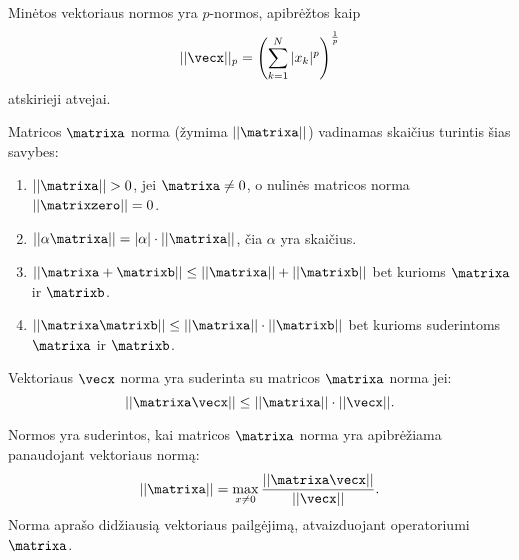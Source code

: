 

Minėtos vektoriaus normos yra $p$-normos, apibrėžtos kaip
\begin{equation*}
  ||\vecx||_{p} = \left( \sum_{k=1}^{N}|x_{k}|^{p} \right)^{\frac{1}{p}}
\end{equation*}
atskirieji atvejai.


\begin{defn}
  Matricos $\matrixa$ norma (žymima $||\matrixa||$) vadinamas skaičius
  turintis šias savybes:
  \begin{enumerate}
    \item $||\matrixa|| > 0$, jei $\matrixa \neq 0$, o nulinės matricos
      norma $||\matrixzero|| = 0$.
    \item $||\alpha\matrixa|| = |\alpha|\cdot||\matrixa||$, čia $\alpha$
      yra skaičius.
    \item $||\matrixa + \matrixb|| \leq ||\matrixa|| + ||\matrixb||$
      bet kurioms $\matrixa$ ir $\matrixb$.
    \item $||\matrixa\matrixb|| \leq ||\matrixa|| \cdot ||\matrixb||$
      bet kurioms suderintoms $\matrixa$ ir $\matrixb$.
  \end{enumerate}
\end{defn}

\begin{defn}
  Vektoriaus $\vecx$ norma yra suderinta su matricos $\matrixa$ norma
  jei:
  \begin{equation*}
    ||\matrixa\vecx|| \leq ||\matrixa|| \cdot ||\vecx||.
  \end{equation*}
\end{defn}

Normos yra suderintos, kai matricos $\matrixa$ norma yra apibrėžiama
panaudojant vektoriaus normą:
\begin{equation*}
  ||\matrixa|| = \max_{x \neq 0} \frac{||\matrixa\vecx||}{||\vecx||}.
\end{equation*}
Norma aprašo didžiausią vektoriaus pailgėjimą, atvaizduojant operatoriumi
$\matrixa$.

